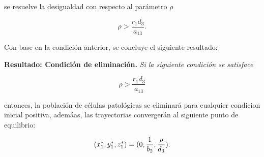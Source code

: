 \documentclass[letterpaper,11pt]{article}
\begin{document}
se resuelve la desigualdad con respecto al par\'{a}metro $\rho $

\begin{equation*}
\rho >\frac{r_{1}d_{3}}{a_{13}}.
\end{equation*}

\qquad Con base en la condici\'{o}n anterior, se concluye el siguiente
resultado:

\bigskip 

\bigskip \textbf{Resultado: Condici\'{o}n de eliminaci\'{o}n.} \textit{Si la
siguiente condici\'{o}n se satisface }

\begin{equation*}
\rho >\frac{r_{1}d_{3}}{a_{13}}
\end{equation*}

entonces, la poblaci\'{o}n de c\'{e}lulas patol\'{o}gicas se eliminar\'{a}
para cualquier condicion inicial positiva, adem\'{a}as, las trayectorias
converger\'{a}n al siguiente punto de equilibrio:

\begin{equation*}
(x_{1}^{\ast },y_{1}^{\ast },z_{1}^{\ast })=(0,\frac{1}{b_{2}},\frac{\rho }{%
d_{3}}).
\end{equation*}
\end{document}
